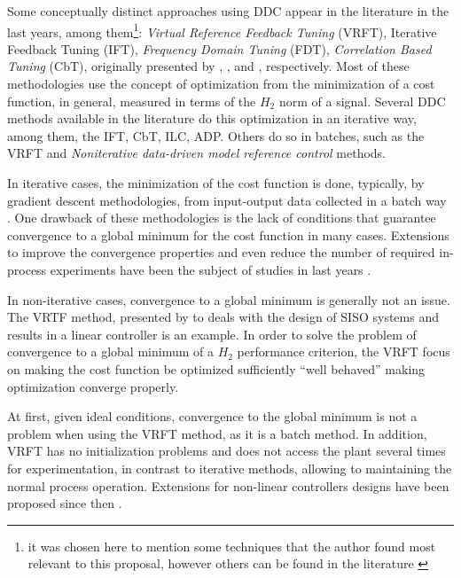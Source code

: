 Some conceptually distinct approaches using DDC appear in the literature in the last years, among them\footnote{it was chosen here to mention some techniques that the author found most relevant to this proposal, however others can be found in the literature \citep{sadegh1998, safonov1995, karimi2007, huang2008, schaal1994, shi2000}}:
\emph{Virtual Reference Feedback Tuning} (VRFT), Iterative Feedback Tuning (IFT), \emph{Frequency Domain Tuning} (FDT), \emph{Correlation Based Tuning} (CbT), originally presented by \cite{campi2002}, \cite{hjalmarsson1994}, \cite{kammer2000} and \cite{karimi2002}, respectively.
Most of these methodologies use the concept of optimization from the minimization of a cost function, in general, measured in terms of the $H_2$ norm of a signal. 
Several DDC methods available in the literature do this optimization in an iterative way, among them, the IFT, CbT, ILC, ADP. 
Others do so in batches, such as the VRFT and \textit{Noniterative data-driven model reference control} methods. 

In iterative cases, the minimization of the cost function is done, typically, by gradient descent methodologies, from input-output data collected in a batch way \citep{bazanella2008a}.
One drawback of these methodologies is the lack of conditions that guarantee convergence to a global minimum for the cost function in many cases.
Extensions to improve the convergence properties and even reduce the number of required in-process experiments have been the subject of studies in last years \citep{huusom2009}.

In non-iterative cases, convergence to a global minimum is generally not an issue. 
The VRTF method, presented by \cite{guardabassi2000a, campi2002} to deals with the design of SISO systems and results in a linear controller is an example.
In order to solve the problem of convergence to a global minimum of a $ H_2 $ performance criterion, the VRFT focus on making the cost function be optimized sufficiently ``well behaved'' making optimization converge properly.

At first, given ideal conditions, convergence to the global minimum is not a problem when using the VRFT method, as it is a batch method. 
In addition, VRFT has no initialization problems and does not access the plant several times for experimentation, in contrast to iterative methods, allowing to maintaining the normal process operation. 
Extensions for non-linear controllers designs have been proposed since then \citep{campi2006a, jeng2014a, jeng2018a}.


